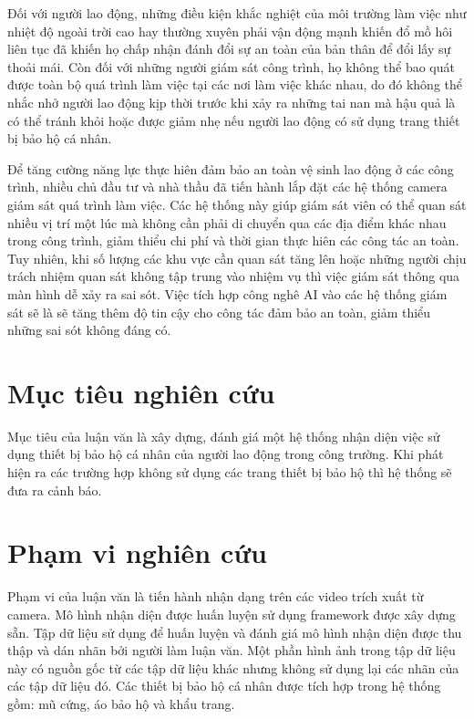 Đối với người lao động, những điều kiện khắc nghiệt của môi trường làm việc như nhiệt độ ngoài trời cao hay thường xuyên phải vận động mạnh khiến đổ mồ hôi liên tục đã khiến họ chấp nhận đánh đổi sự an toàn của bản thân để đổi lấy sự thoải mái. Còn đối với những người giám sát công trình, họ không thể bao quát được toàn bộ quá trình làm việc tại các nơi làm việc khác nhau, do đó không thể nhắc nhở người lao động kịp thời trước khi xảy ra những tai nan mà hậu quả là có thể tránh khỏi hoặc được giảm nhẹ nếu người lao động có sử dụng trang thiết bị bảo hộ cá nhân.

Để tăng cường năng lực thực hiên đảm bảo an toàn vệ sinh lao động ở các công trình, nhiều chủ đầu tư và nhà thầu đã tiến hành lắp đặt các hệ thống camera giám sát quá trình làm việc. Các hệ thống này giúp giám sát viên có thể quan sát nhiều vị trí một lúc mà không cần phải di chuyển qua các địa điểm khác nhau trong công trình, giảm thiểu chi phí và thời gian thực hiên các công tác an toàn. Tuy nhiên, khi số lượng các khu vực cần quan sát tăng lên hoặc những người chịu trách nhiệm quan sát không tập trung vào nhiệm vụ  thì việc giám sát thông qua màn hình dễ xảy ra sai sót. Việc tích hợp công nghê AI vào các hệ thống giám sát sẽ là sẽ tăng thêm độ tin cậy cho công tác đảm bảo an toàn, giảm thiểu những sai sót không đáng có.

\section{Mục tiêu nghiên cứu}
Mục tiêu của luận văn là xây dựng, đánh giá một hệ thống nhận diện việc sử dụng thiết bị bảo hộ cá nhân của người lao động trong công trường. Khi phát hiện ra các trường hợp không sử dụng các trang thiết bị bảo hộ thì hệ thống sẽ đưa ra cảnh báo.  

\section{Phạm vi nghiên cứu}
Phạm vi của luận văn là tiến hành nhận dạng trên các video trích xuất từ camera. Mô hình nhận diện được huấn luyện sử dụng framework được xây dựng sẵn. Tập dữ liệu sử dụng để huấn luyện và đánh giá mô hình nhận diện được thu thập và dán nhãn bởi người làm luận văn. Một phần hình ảnh trong tập dữ liệu này có nguồn gốc từ các tập dữ liệu khác nhưng không sử dụng lại các nhãn của các tập dữ liệu đó. Các thiết bị bảo hộ cá nhân được tích hợp trong hệ thống gồm: mũ cứng, áo bảo hộ và khẩu trang.


